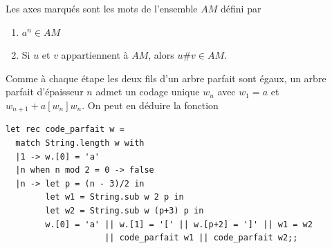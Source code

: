 \begin{Exercise}
Les axes marqués sont les mots de l'ensemble $AM$ défini par

\begin{enumerate}
\item $a^n \in AM$
\item Si $u$ et $v$ appartiennent à $AM$, alors $u\# v \in AM$.
\end{enumerate}

\begin{center}
\end{center}

\end{Exercise}
\begin{Exercise}
Comme à chaque étape les deux fils d'un arbre parfait sont égaux, un arbre parfait d'épaisseur $n$ admet un codage unique $w_n$ avec $w_1=a$ et $w_{n+1} + a[w_n]w_n$. On peut en déduire la fonction
\begin{lstlisting}
let rec code_parfait w =
  match String.length w with
  |1 -> w.[0] = 'a'
  |n when n mod 2 = 0 -> false
  |n -> let p = (n - 3)/2 in
        let w1 = String.sub w 2 p in
        let w2 = String.sub w (p+3) p in
        w.[0] = 'a' || w.[1] = '[' || w.[p+2] = ']' || w1 = w2
                    || code_parfait w1 || code_parfait w2;;
  \end{lstlisting}

\end{Exercise}
